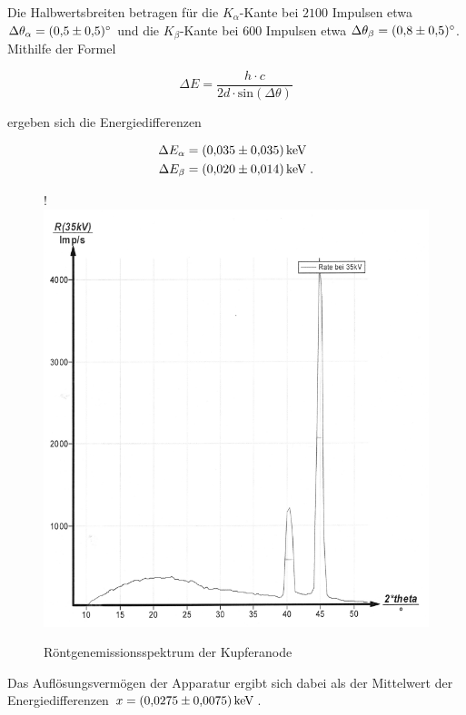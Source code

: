Die Halbwertsbreiten betragen für die $K_\alpha$-Kante bei $2100$ Impulsen
etwa $\Delta \theta_\alpha = \SI{0.5 +- 0.5}{\degree}$ und die $K_\beta$-Kante bei $600$ Impulsen
etwa $\Delta \theta_\beta = \SI{0.8 +- 0.5}{\degree}$.
Mithilfe der Formel

\begin{equation}
  \Delta E = \frac{h \cdot c}{2d \cdot \text{sin}\left(\Delta \theta \right)}
\end{equation}

ergeben sich die Energiedifferenzen 

\begin{align*}
  \Delta E_\alpha &= \SI{0.035 +- 0.035}{\kilo\eV} \\
  \Delta E_\beta &= \SI{0.020 +- 0.014}{\kilo\eV}  \; .
\end{align*}

\begin{figure}[H]!
  \centering
  \includegraphics[scale=0.3]{content/bild2.png}
  \caption{Röntgenemissionsspektrum der Kupferanode}
  \label{fig:plot2}
\end{figure}

Das Auflösungsvermögen der Apparatur ergibt sich dabei als der Mittelwert der 
Energiedifferenzen $ x = \SI{0.0275 +- 0.0075}{\kilo\eV}$.

